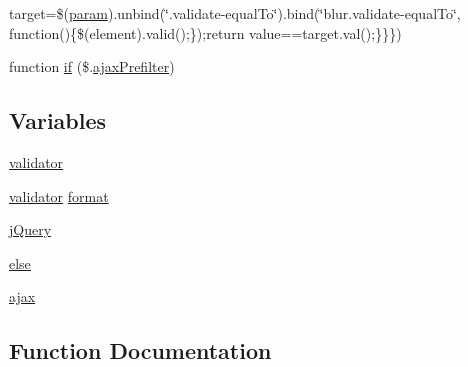 \begin{DoxyCompactItemize}
target=\$(\hyperlink{_scripts_2jquery-1_810_82_8min_8js_ae8915303d11557d1b001bc56b6195251}{param}).unbind(\char`\"{}.validate-\/equal\+To\char`\"{}).bind(\char`\"{}blur.\+validate-\/equal\+To\char`\"{}, function()\{\$(element).valid();\});return value==target.\+val();\}\}\})
\item 
function \hyperlink{jquery_8validate-vsdoc_8js_a16ce734a141a1eebcad26fae286eb128}{if} (\$.\hyperlink{_scripts_2jquery-1_810_82_8js_a144939e373cc1ad511a53c4251ec7ffa}{ajax\+Prefilter})
\end{DoxyCompactItemize}
\subsection*{Variables}
\begin{DoxyCompactItemize}
\item 
\hyperlink{jquery_8validate-vsdoc_8js_a2dc8272bb221cdffcccbd20db038f172}{validator}
\item 
\hyperlink{_scripts_2jquery_8validate_8js_a2dc8272bb221cdffcccbd20db038f172}{validator} \hyperlink{jquery_8validate-vsdoc_8js_a387137c43ed9616d39ba90e890d181eb}{format}
\item 
\hyperlink{jquery_8validate-vsdoc_8js_a2b1d6f9c448e3ce72f4e1865d6e38d2c}{j\+Query}
\item 
\hyperlink{jquery_8validate-vsdoc_8js_a0544c3fe466e421738dae463968b70ba}{else}
\item 
\hyperlink{jquery_8validate-vsdoc_8js_a77004c0fdc08a5bc07afa0b099cdf6df}{ajax}
\end{DoxyCompactItemize}


\subsection{Function Documentation}
\hypertarget{jquery_8validate-vsdoc_8js_a08553879d4a764e75170d547d37bd35f}{}
